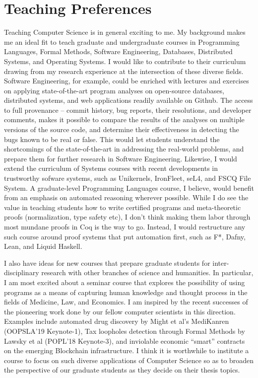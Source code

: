 \section*{Teaching Preferences}

Teaching Computer Science is in general exciting to me. My background
makes me an ideal fit to teach graduate and undergraduate courses in
Programming Languages, Formal Methods, Software Engineering,
Databases, Distributed Systems, and Operating Systems. I would like to
contribute to their curriculum drawing from my research experience at
the intersection of these diverse fields. Software Engineering, for
example, could be enriched with lectures and exercises on applying
state-of-the-art program analyses on open-source databases,
distributed systems, and web applications readily available on Github.
The access to full provenance -- commit history, bug reports, their
resolutions, and developer comments, makes it possible to compare the
results of the analyses on multiple versions of the source code, and
determine their effectiveness in detecting the bugs known to be real
or false.  This would let students understand the shortcomings of the
state-of-the-art in addressing the real-world problems, and prepare
them for further research in Software Engineering. Likewise, I would
extend the curriculum of Systems courses with recent developments in
trustworthy sofware systems, such as Unikernels, IronFleet, seL4, and
FSCQ File System. A graduate-level Programming Languages course, I
believe, would benefit from an emphasis on automated reasoning
wherever possible. While I do see the value in teaching students how
to write certified programs and meta-theoretic proofs (normalization,
type safety etc), I don't think making them labor through most mundane
proofs in Coq is the way to go. Instead, I would restructure any such
course around proof systems that put automation first, such as F*,
Dafny, Lean, and Liquid Haskell. 

I also have ideas for new courses that prepare graduate students for
inter-disciplinary research with other branches of science and
humanities. In particular, I am most excited about a seminar course
that explores the possibility of using programs as a means of
capturing human knowledge and thought process in the fields of
Medicine, Law, and Economics. I am inspired by the recent successes of
the pioneering work done by our fellow computer scientists in this
direction. Examples include automated drug discovery by Might et al's
MediKanren (OOPSLA'19 Keynote-1), Tax loopholes detection through
Formal Methods by Lawsky et al (POPL'18 Keynote-3), and inviolable
economic ``smart'' contracts on the emerging Blockchain
infrastructure. I think it is worthwhile to institute a course to
focus on such diverse applications of Computer Science so as to
broaden the perspective of our graduate students as they decide on
their thesis topics.

